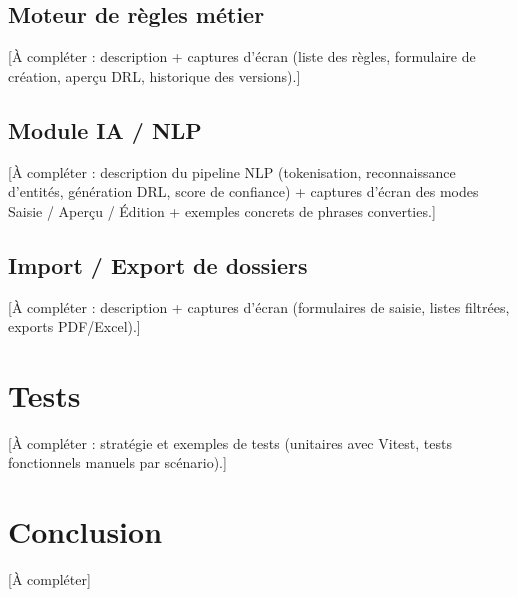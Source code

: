 \subsection{Moteur de r\`egles m\'etier}
[\`A compl\'eter : description + captures d'\'ecran (liste des r\`egles,
formulaire de cr\'eation, aper\c{c}u DRL, historique des versions).]

\subsection{Module IA / NLP}

[\`A compl\'eter : description du pipeline NLP (tokenisation,
reconnaissance d'entit\'es, g\'en\'eration DRL, score de confiance) +
captures d'\'ecran des modes Saisie / Aper\c{c}u / \'Edition + exemples
concrets de phrases converties.]

\subsection{Import / Export de dossiers}
[\`A compl\'eter : description + captures d'\'ecran (formulaires de
saisie, listes filtr\'ees, exports PDF/Excel).]

\section{Tests}

[\`A compl\'eter : strat\'egie et exemples de tests (unitaires avec Vitest,
tests fonctionnels manuels par sc\'enario).]

\section{Conclusion}

[\`A compl\'eter]

\clearpage
